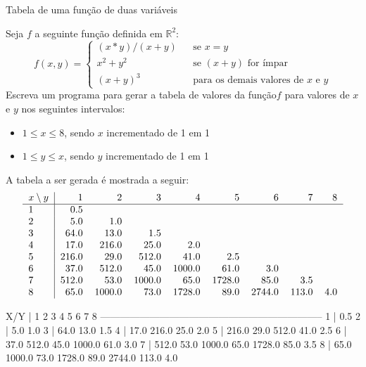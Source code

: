 \documentclass[11pt]{practice}
\begin{document}
 \begin{task}[breakable]{Tabela de uma função de duas variáveis}{}

   Seja $f$ a seguinte função definida em $\mathbb{R}^2$:
   \[ f(x, y)	= \left\{ \begin{array}{lcl}
				(x*y)/(x+y) & & \text{se $x = y$} \\
				x^2+y^2	   & & \text{se $(x+y)$ for ímpar} \\
				(x+y)^3	   & & \text{para os demais valores de $x$ e $y$}
                          \end{array} \right.
  \]
  Escreva um programa para gerar a tabela de valores da função$f$ para
  valores de $x$ e $y$ nos seguintes intervalos:
  \begin{itemize}
    \item $1 \leq x \leq 8$, sendo $x$ incrementado de 1 em 1
    \item $1 \leq y \leq x$, sendo $y$ incrementado de 1 em 1
  \end{itemize}
  A tabela a ser gerada é mostrada a seguir:
  \[\begin{tabular}{l|rrrrrrrr} 
    $x  \setminus y$ & 1 & 2 & 3 & 4 & 5 & 6 & 7 & 8 \\\hline
    1        & 0.5 \\
    2        & 5.0 & 1.0 \\
    3        & 64.0 & 13.0 & 1.5 \\
    4        & 17.0 &  216.0 &  25.0 &   2.0 \\   
    5        & 216.0  &  29.0 & 512.0  &  41.0 &  2.5 \\   
    6        & 37.0 &  512.0  & 45.0 & 1000.0  &  61.0 &  3.0 \\   
    7        & 512.0 &  53.0 &  1000.0  & 65.0 &  1728.0 &  85.0 &  3.5 \\   
    8        & 65.0  & 1000.0 &  73.0  & 1728.0 & 89.0 &  2744.0 & 113.0 & 4.0 \\   
  \end{tabular}
  \]

  \begin{runexample}
X/Y |     1       2       3       4       5       6       7       8
--------------------------------------------------------------------
  1 |    0.5  
  2 |    5.0     1.0  
  3 |   64.0    13.0     1.5  
  4 |   17.0   216.0    25.0     2.0  
  5 |  216.0    29.0   512.0    41.0     2.5  
  6 |   37.0   512.0    45.0  1000.0    61.0     3.0  
  7 |  512.0    53.0  1000.0    65.0  1728.0    85.0     3.5  
  8 |   65.0  1000.0    73.0  1728.0    89.0  2744.0   113.0     4.0    
  \end{runexample}

  \tcblower
  \solution
\end{task}
\end{document}
